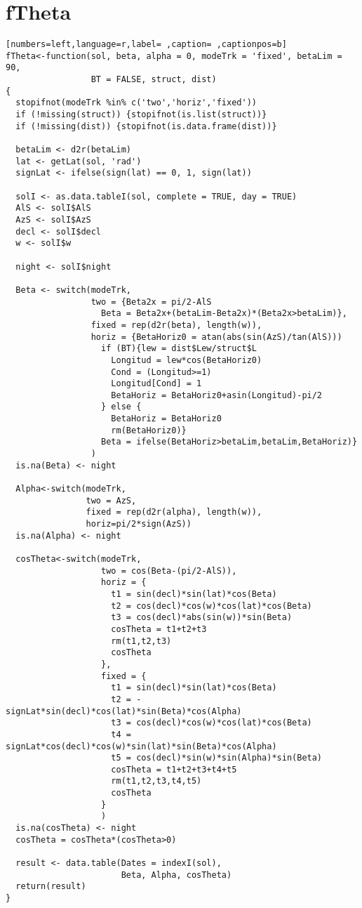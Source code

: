 \section{fTheta}
\label{sec:org0d6430c}
\begin{lstlisting}[numbers=left,language=r,label= ,caption= ,captionpos=b]
fTheta<-function(sol, beta, alpha = 0, modeTrk = 'fixed', betaLim = 90, 
                 BT = FALSE, struct, dist)
{
  stopifnot(modeTrk %in% c('two','horiz','fixed'))
  if (!missing(struct)) {stopifnot(is.list(struct))}
  if (!missing(dist)) {stopifnot(is.data.frame(dist))}
  
  betaLim <- d2r(betaLim)
  lat <- getLat(sol, 'rad')
  signLat <- ifelse(sign(lat) == 0, 1, sign(lat)) 
  
  solI <- as.data.tableI(sol, complete = TRUE, day = TRUE)
  AlS <- solI$AlS
  AzS <- solI$AzS
  decl <- solI$decl
  w <- solI$w
  
  night <- solI$night

  Beta <- switch(modeTrk,
                 two = {Beta2x = pi/2-AlS	
                   Beta = Beta2x+(betaLim-Beta2x)*(Beta2x>betaLim)},
                 fixed = rep(d2r(beta), length(w)), 
                 horiz = {BetaHoriz0 = atan(abs(sin(AzS)/tan(AlS)))
                   if (BT){lew = dist$Lew/struct$L
                     Longitud = lew*cos(BetaHoriz0)
                     Cond = (Longitud>=1)
                     Longitud[Cond] = 1
                     BetaHoriz = BetaHoriz0+asin(Longitud)-pi/2                                     
                   } else {
                     BetaHoriz = BetaHoriz0
                     rm(BetaHoriz0)}
                   Beta = ifelse(BetaHoriz>betaLim,betaLim,BetaHoriz)}
                 )
  is.na(Beta) <- night

  Alpha<-switch(modeTrk,
                two = AzS,
                fixed = rep(d2r(alpha), length(w)),
                horiz=pi/2*sign(AzS))
  is.na(Alpha) <- night
  
  cosTheta<-switch(modeTrk,
                   two = cos(Beta-(pi/2-AlS)),
                   horiz = {
                     t1 = sin(decl)*sin(lat)*cos(Beta)      
                     t2 = cos(decl)*cos(w)*cos(lat)*cos(Beta)   
                     t3 = cos(decl)*abs(sin(w))*sin(Beta)   
                     cosTheta = t1+t2+t3
                     rm(t1,t2,t3)
                     cosTheta
                   },
                   fixed = {
                     t1 = sin(decl)*sin(lat)*cos(Beta)      
                     t2 = -signLat*sin(decl)*cos(lat)*sin(Beta)*cos(Alpha) 
                     t3 = cos(decl)*cos(w)*cos(lat)*cos(Beta)   
                     t4 = signLat*cos(decl)*cos(w)*sin(lat)*sin(Beta)*cos(Alpha) 
                     t5 = cos(decl)*sin(w)*sin(Alpha)*sin(Beta)   
                     cosTheta = t1+t2+t3+t4+t5
                     rm(t1,t2,t3,t4,t5)
                     cosTheta
                   }
                   )
  is.na(cosTheta) <- night
  cosTheta = cosTheta*(cosTheta>0) 
  
  result <- data.table(Dates = indexI(sol),
                       Beta, Alpha, cosTheta)
  return(result)
}
\end{lstlisting}
